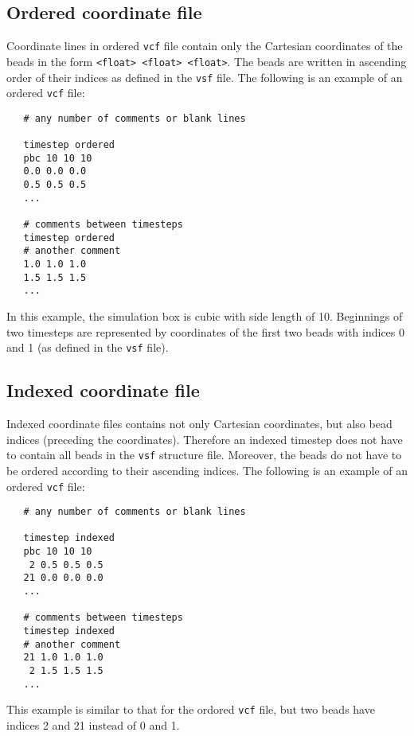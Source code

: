 \subsection{Ordered coordinate file} \label{ssec:OrderedVcf}

Coordinate lines in ordered \texttt{vcf} file contain only the Cartesian
coordinates of the beads in the form \texttt{<float> <float> <float>}. The
beads are written in ascending order of their indices as defined in the
\texttt{vsf} file. The following is an example of an ordered \texttt{vcf}
file:

\begin{verbatim}
   # any number of comments or blank lines

   timestep ordered
   pbc 10 10 10
   0.0 0.0 0.0
   0.5 0.5 0.5
   ...

   # comments between timesteps
   timestep ordered
   # another comment
   1.0 1.0 1.0
   1.5 1.5 1.5
   ...
\end{verbatim}

In this example, the simulation box is cubic with side length of 10.
Beginnings of two timesteps are represented by coordinates of the first two
beads with indices 0 and 1 (as defined in the \texttt{vsf} file).

\subsection{Indexed coordinate file} \label{ssec:IndexedVcf}

Indexed coordinate files contains not only Cartesian coordinates, but also
bead indices (preceding the coordinates). Therefore an
indexed timestep does not have to contain all beads in the \texttt{vsf}
structure file. Moreover, the beads do not have to be ordered according to
their ascending indices.  The following is an example of an ordered
\texttt{vcf} file:

\begin{verbatim}
   # any number of comments or blank lines

   timestep indexed
   pbc 10 10 10
    2 0.5 0.5 0.5
   21 0.0 0.0 0.0
   ...

   # comments between timesteps
   timestep indexed
   # another comment
   21 1.0 1.0 1.0
    2 1.5 1.5 1.5
   ...
\end{verbatim}

This example is similar to that for the ordored \texttt{vcf} file, but two
beads have indices 2 and 21 instead of 0 and 1. %

